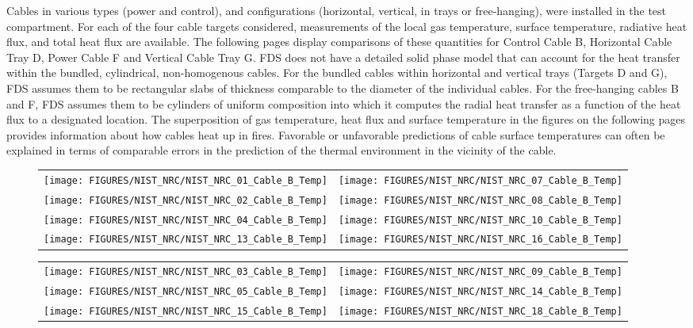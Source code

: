 Cables in various types (power and control), and configurations (horizontal, vertical, in trays or free-hanging), were installed in
the test compartment.
For each of the four cable targets considered, measurements of the local gas temperature, surface temperature, radiative heat flux,
and total heat flux are available.  The following pages display comparisons of these quantities for
Control Cable B, Horizontal Cable Tray D, Power Cable F and Vertical Cable Tray G.
FDS does not have a detailed solid phase model that can account for the heat transfer within the bundled,
cylindrical, non-homogenous cables.  For the bundled cables within horizontal and vertical trays (Targets D and G),
FDS assumes them to be rectangular slabs of thickness comparable to the diameter of the individual cables.
For the free-hanging cables B and F, FDS assumes them to be cylinders of uniform composition into which it
computes the radial heat transfer as a function of the heat flux to a designated location.
The superposition of gas temperature, heat flux and surface temperature in the figures on the following pages
provides information about how cables heat up in fires.  Favorable or unfavorable predictions of cable surface
temperatures can often be explained in terms of comparable errors in the prediction of the thermal environment in the vicinity of the cable.

\begin{figure}[p]
\begin{tabular*}{\textwidth}{l@{\extracolsep{\fill}}r}
\texttt{[image: FIGURES/NIST\_NRC/NIST\_NRC\_01\_Cable\_B\_Temp]} &
\texttt{[image: FIGURES/NIST\_NRC/NIST\_NRC\_07\_Cable\_B\_Temp]} \\
\texttt{[image: FIGURES/NIST\_NRC/NIST\_NRC\_02\_Cable\_B\_Temp]} &
\texttt{[image: FIGURES/NIST\_NRC/NIST\_NRC\_08\_Cable\_B\_Temp]} \\
\texttt{[image: FIGURES/NIST\_NRC/NIST\_NRC\_04\_Cable\_B\_Temp]} &
\texttt{[image: FIGURES/NIST\_NRC/NIST\_NRC\_10\_Cable\_B\_Temp]} \\
\texttt{[image: FIGURES/NIST\_NRC/NIST\_NRC\_13\_Cable\_B\_Temp]} &
\texttt{[image: FIGURES/NIST\_NRC/NIST\_NRC\_16\_Cable\_B\_Temp]}
\end{tabular*}
\label{NIST_NRC_Cable_B_Closed}
\end{figure}

\begin{figure}[p]
\begin{tabular*}{\textwidth}{l@{\extracolsep{\fill}}r}
\texttt{[image: FIGURES/NIST\_NRC/NIST\_NRC\_03\_Cable\_B\_Temp]} &
\texttt{[image: FIGURES/NIST\_NRC/NIST\_NRC\_09\_Cable\_B\_Temp]} \\
\texttt{[image: FIGURES/NIST\_NRC/NIST\_NRC\_05\_Cable\_B\_Temp]} &
\texttt{[image: FIGURES/NIST\_NRC/NIST\_NRC\_14\_Cable\_B\_Temp]} \\
\texttt{[image: FIGURES/NIST\_NRC/NIST\_NRC\_15\_Cable\_B\_Temp]} &
\texttt{[image: FIGURES/NIST\_NRC/NIST\_NRC\_18\_Cable\_B\_Temp]}
\end{tabular*}
\label{NIST_NRC_Cable_B_Open}
\end{figure}

